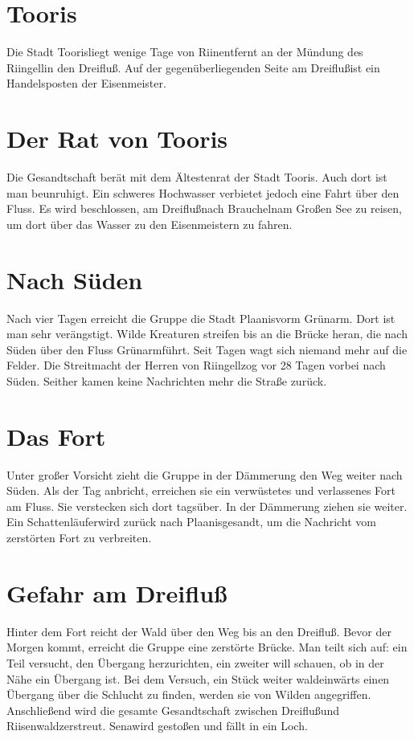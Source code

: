 \documentclass[12pt,a4paper,onecolumn,twoside,ngerman]{book}
\newcommand{\Sena}{Sena}
\newcommand{\Schattenlaufer}{Schattenläufer}
\newcommand{\Rhingell}{Riingell}
\newcommand{\Rhin}{Riin}
\newcommand{\Dreifluss}{Dreifluß}
\newcommand{\Toris}{Tooris}
\newcommand{\Planis}{Plaanis}
\newcommand{\Grunarm}{Grünarm}
\newcommand{\Grunland}{Grünland}
\newcommand{\Braucheln}{Braucheln}
\newcommand{\Riesenwald}{Riisenwald}
\newcommand{\Eisenmeister}{Eisenmeister}
\begin{document}
\section{\Toris}
Die Stadt \Toris  liegt wenige Tage von \Rhin  entfernt an der Mündung des \Rhingell  in den \Dreifluss . Auf der gegenüberliegenden Seite am \Dreifluss  ist ein Handelsposten der \Eisenmeister .

\section{Der Rat von \Toris}
Die Gesandtschaft berät mit dem Ältestenrat der Stadt \Toris . Auch dort ist man beunruhigt. Ein schweres Hochwasser verbietet jedoch eine Fahrt über den Fluss. Es wird beschlossen, am \Dreifluss  nach \Braucheln  am Großen See zu reisen, um dort über das Wasser zu den \Eisenmeister n zu fahren.

\section{Nach Süden}
Nach vier Tagen erreicht die Gruppe die Stadt \Planis  vorm \Grunarm . Dort ist man sehr verängstigt. Wilde Kreaturen streifen bis an die Brücke heran, die nach Süden über den Fluss \Grunarm  führt. Seit Tagen wagt sich niemand mehr auf die Felder. Die Streitmacht der Herren von \Rhingell  zog vor 28 Tagen vorbei nach Süden. Seither kamen keine Nachrichten mehr die Straße zurück.
 
\section{Das Fort}
Unter großer Vorsicht zieht die Gruppe in der Dämmerung den Weg weiter nach Süden. Als der Tag anbricht, erreichen sie ein verwüstetes und verlassenes Fort am Fluss. Sie verstecken sich dort tagsüber. In der Dämmerung ziehen sie weiter. Ein \Schattenlaufer wird zurück nach \Planis gesandt, um die Nachricht vom zerstörten Fort zu verbreiten.

\section{Gefahr am \Dreifluss}
Hinter dem Fort reicht der Wald über den Weg bis an den \Dreifluss . Bevor der Morgen kommt, erreicht die Gruppe eine zerstörte Brücke. Man teilt sich auf: ein Teil versucht, den Übergang herzurichten, ein zweiter will schauen, ob in der Nähe ein Übergang ist. Bei dem Versuch, ein Stück weiter waldeinwärts einen Übergang über die Schlucht zu finden, werden sie von Wilden angegriffen. Anschließend wird die gesamte Gesandtschaft zwischen \Dreifluss  und \Riesenwald  zerstreut.  \Sena wird gestoßen und fällt in ein Loch.
\end{document}
